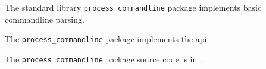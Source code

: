 
The standard library {\tt process\_commandline} package implements basic commandline parsing.

The {\tt process\_commandline} package implements the  api.

The {\tt process\_commandline} package source code is in .



